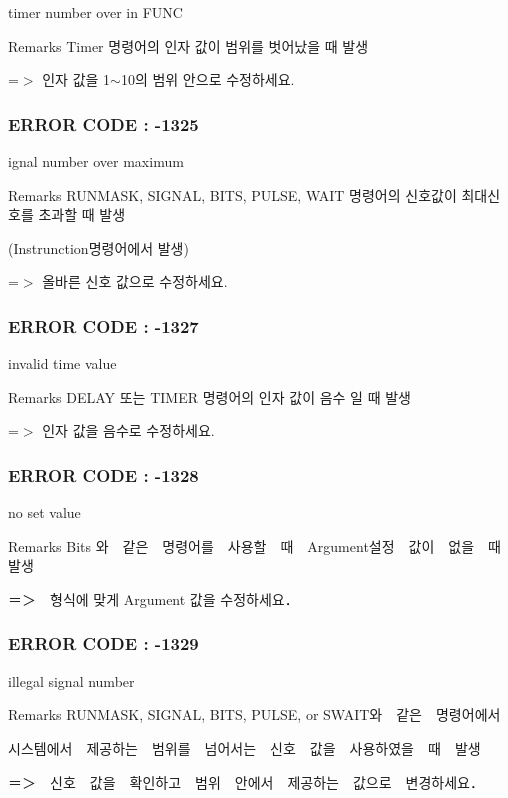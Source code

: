 timer number over in F\-U\-N\-C \begin{DoxyRemark}{Remarks}
Timer 명령어의 인자 값이 범위를 벗어났을 때 발생 \par
 =$>$ 인자 값을 1$\sim$10의 범위 안으로 수정하세요.
\end{DoxyRemark}


 \subsubsection*{E\-R\-R\-O\-R C\-O\-D\-E \-: -\/1325 }

ignal number over maximum \begin{DoxyRemark}{Remarks}
R\-U\-N\-M\-A\-S\-K, S\-I\-G\-N\-A\-L, B\-I\-T\-S, P\-U\-L\-S\-E, W\-A\-I\-T 명령어의 신호값이 최대신호를 초과할 때 발생 \par
 (Instrunction명령어에서 발생) \par
 =$>$ 올바른 신호 값으로 수정하세요.
\end{DoxyRemark}


 \subsubsection*{E\-R\-R\-O\-R C\-O\-D\-E \-: -\/1327 }

invalid time value \begin{DoxyRemark}{Remarks}
D\-E\-L\-A\-Y 또는 T\-I\-M\-E\-R 명령어의 인자 값이 음수 일 때 발생 \par
 =$>$ 인자 값을 음수로 수정하세요.
\end{DoxyRemark}


 \subsubsection*{E\-R\-R\-O\-R C\-O\-D\-E \-: -\/1328 }

no set value \begin{DoxyRemark}{Remarks}
Bits 와　같은　명령어를　사용할　때　\-Argument설정　값이　없을　때　발생 \par
 ＝＞　형식에 맞게 Argument 값을 수정하세요．
\end{DoxyRemark}


 \subsubsection*{E\-R\-R\-O\-R C\-O\-D\-E \-: -\/1329 }

illegal signal number \begin{DoxyRemark}{Remarks}
R\-U\-N\-M\-A\-S\-K, S\-I\-G\-N\-A\-L, B\-I\-T\-S, P\-U\-L\-S\-E, or S\-W\-A\-I\-T와　같은　명령어에서　\par
 시스템에서　제공하는　범위를　넘어서는　신호　값을　사용하였을　때　발생 \par
 ＝＞　신호　값을　확인하고　범위　안에서　제공하는　값으로　변경하세요．
\end{DoxyRemark}


